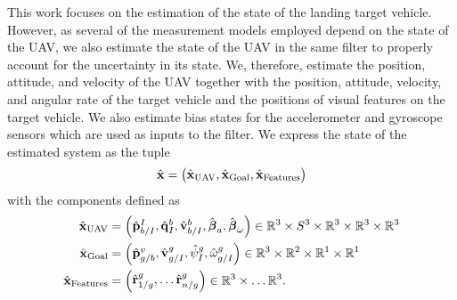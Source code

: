 
This work focuses on the estimation of the state of the landing target vehicle.
However, as several of the measurement models employed depend on the state of the
UAV, we also estimate the state of the UAV in the same filter to properly
account for the uncertainty in its state. We, therefore, estimate the position,
attitude, and velocity of the UAV together with the position, attitude, velocity,
and angular rate of the target vehicle and the positions of visual features on
the target vehicle. We also estimate bias states for the
accelerometer and gyroscope sensors which are used as inputs to the filter.
We express the state of the estimated system as the tuple
\begin{equation}
  \hat{\boldsymbol{\mathrm{x}}} =
  \begin{pmatrix}
    \hat{\boldsymbol{\mathrm{x}}}_{\text{UAV}}, \hat{\boldsymbol{\mathrm{x}}}_{\text{Goal}}, \hat{\boldsymbol{\mathrm{x}}}_{\text{Features}}
  \end{pmatrix}
\end{equation}
with the components defined as
\begin{align}
  \hat{\boldsymbol{\mathrm{x}}}_{\text{UAV}} &=
  \begin{pmatrix}
    \hat{\boldsymbol{\mathrm{p}}}_{b/I}^{I}, \hat{\boldsymbol{\mathrm{q}}}_I^{b}, \hat{\boldsymbol{\mathrm{v}}}_{b/I}^b,
    \hat{\boldsymbol{\mathrm{\beta}}}_a,
    \hat{\boldsymbol{\mathrm{\beta}}}_{\omega}
  \end{pmatrix}
    \in \mathbb{R}^3 \times S^3 \times \mathbb{R}^3 \times \mathbb{R}^3 \times
    \mathbb{R}^3  \\
    \hat{\boldsymbol{\mathrm{x}}}_{\text{Goal}} & =
    \begin{pmatrix}
      \hat{\boldsymbol{\mathrm{p}}}_{g/b}^{v}, \hat{\boldsymbol{\mathrm{v}}}_{g/I}^{g}, \hat{\psi}_{I}^{g},
      \hat{\omega}_{g/I}^{g}
    \end{pmatrix}
    \in \mathbb{R}^3 \times \mathbb{R}^2 \times \mathbb{R}^1 \times \mathbb{R}^1
    \\
    \hat{\boldsymbol{\mathrm{x}}}_{\text{Features}} & =
    \begin{pmatrix}
      \hat{\boldsymbol{\mathrm{r}}}_{1/g}^{g}, \dots \hat{\boldsymbol{\mathrm{r}}}_{n/g}^{g}
    \end{pmatrix}
    \in \mathbb{R}^3 \times \dots \mathbb{R}^3.
\end{align}
